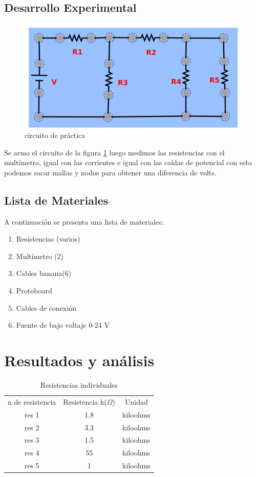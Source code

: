 \documentclass{article}
\begin{document}
\begin{multicols}{2}
\section{Desarrollo Experimental}\label{Desarrollo experimental}				%
\begin{figure}[H]
    \centering
    \includegraphics[scale=0.4]{../imgs/k0.png}
    \caption{circuito de práctica}
    \label{fig:1}
\end{figure}
Se armo el circuito de la figura \ref{fig:1} luego
medimos las resistencias con el multímetro, igual con las corrientes e igual con las caídas de potencial
con esto podemos sacar mallas y nodos para obtener una diferencia de volts.
\subsection*{Lista de Materiales}
A continuación se presenta una lista de materiales:
\begin{enumerate}
    \item Resistencias (varios)
    \item Multímetro (2)
    \item Cables banana(6)
    \item Protoboard
    \item Cables de conexión 
    \item Fuente de bajo voltaje 0-24 V
\end{enumerate}
\end{multicols}
\section{Resultados y análisis}\label{Resultados}			%

\begin{table}[H]
\centering
\begin{tabular}{|c|c|c|}
    \hline
    n de resistencia & Resistencia k($\Omega$) & Unidad\\
    res 1 & 1.8 & kiloohms\\
    res 2 & 3.3 & kiloohms\\
    res 3 & 1.5 & kiloohms\\
    res 4 & 55 & kiloohms\\
    res 5 & 1 & kiloohms\\
    \hline
\end{tabular}
\caption{Resistencias individuales}
\label{tab:1}
\end{table}
\end{document}
